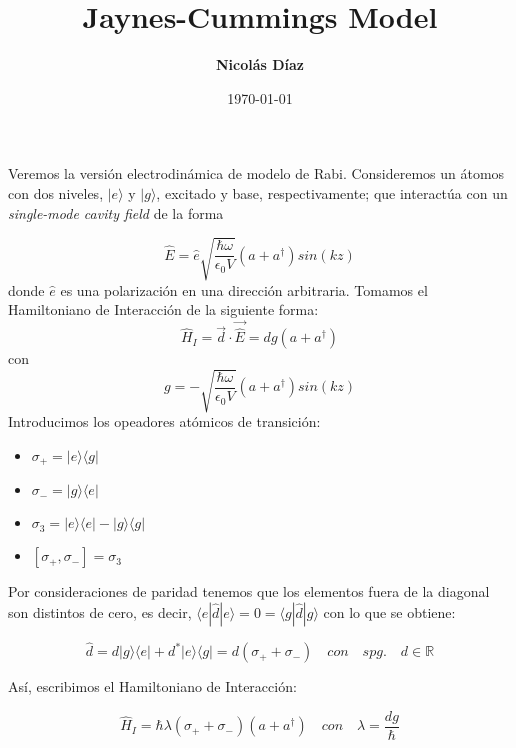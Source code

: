 \documentclass[spanish]{article}
\begin{document}
\title {\textbf{Jaynes-Cummings Model}}
\author {\textbf{Nicolás Díaz}}
\date{\today}

\maketitle


Veremos la versión electrodinámica de modelo de Rabi. Consideremos un átomos con dos niveles, $|e\rangle$ y $|g\rangle$, excitado y base, respectivamente; que interactúa con un \textit{single-mode cavity field} de la forma

\begin{equation}
\hat{E} = \hat{e}\sqrt{\frac{\hbar \omega}{\epsilon_0 V}}(a+a^\dagger)sin(kz)
\end{equation}
donde $\hat{e}$ es una polarización en una dirección arbitraria. Tomamos el Hamiltoniano de Interacción de la siguiente forma: 
\begin{equation}
\hat{H}_I = \vec{d}\cdot\vec{\hat{E}} = dg(a+a^\dagger)
\end{equation}
con $$ g = -\sqrt{\frac{\hbar \omega}{\epsilon_0 V}}(a+a^\dagger)sin(kz)$$
Introducimos los opeadores atómicos de transición: 

\begin{itemize}
\item $\sigma_+ = |e\rangle \langle g|$  
\item $\sigma_- = |g\rangle \langle e|$
\item $\sigma_3 = |e\rangle \langle e| - |g\rangle \langle g|$
\item $[\sigma_+,\sigma_-] = \sigma_3$
\end{itemize}

Por consideraciones de paridad tenemos que los elementos fuera de la diagonal son distintos de cero, es decir, $\langle e|\hat{d}|e\rangle = 0 = \langle g|\hat{d}|g\rangle$ con lo que se obtiene:

\begin{equation}
\hat{d} = d|g\rangle\langle e| + d^* |e\rangle\langle g| = d(\sigma_+ + \sigma_-) \quad con \quad spg. \quad d \in \mathbb{R}
\end{equation}

Así, escribimos el Hamiltoniano de Interacción:

\begin{equation}
\hat{H}_I=\hbar\lambda(\sigma_+ + \sigma_-)(a+a^\dagger) \quad con \quad \lambda = \frac{dg}{\hbar}
\label{H:Int}
\end{equation}
\end{document}
